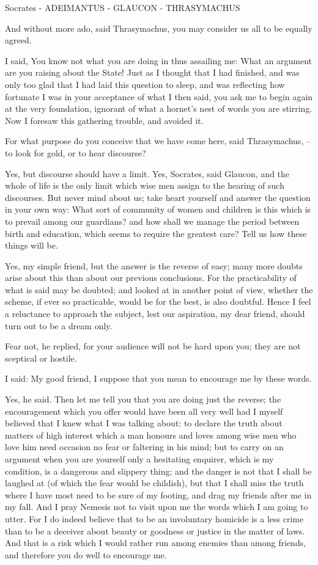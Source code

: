 Socrates - ADEIMANTUS - GLAUCON - THRASYMACHUS

And without more ado, said Thrasymachus, you may consider us all to be equally agreed.

I said, You know not what you are doing in thus assailing me: What an argument are you raising about the State! Just as I thought that I had finished, and was only too glad that I had laid this question to sleep, and was reflecting how fortunate I was in your acceptance of what I then said, you ask me to begin again at the very foundation, ignorant of what a hornet's nest of words you are stirring. Now I foresaw this gathering trouble, and avoided it.

For what purpose do you conceive that we have come here, said Thrasymachus, --to look for gold, or to hear discourse?

Yes, but discourse should have a limit.
Yes, Socrates, said Glaucon, and the whole of life is the only limit which wise men assign to the hearing of such discourses. But never mind about us; take heart yourself and answer the question in your own way: What sort of community of women and children is this which is to prevail among our guardians? and how shall we manage the period between birth and education, which seems to require the greatest care? Tell us how these things will be.

Yes, my simple friend, but the answer is the reverse of easy; many more doubts arise about this than about our previous conclusions. For the practicability of what is said may be doubted; and looked at in another point of view, whether the scheme, if ever so practicable, would be for the best, is also doubtful. Hence I feel a reluctance to approach the subject, lest our aspiration, my dear friend, should turn out to be a dream only.

Fear not, he replied, for your audience will not be hard upon you; they are not sceptical or hostile.

I said: My good friend, I suppose that you mean to encourage me by these words.

Yes, he said.
Then let me tell you that you are doing just the reverse; the encouragement which you offer would have been all very well had I myself believed that I knew what I was talking about: to declare the truth about matters of high interest which a man honours and loves among wise men who love him need occasion no fear or faltering in his mind; but to carry on an argument when you are yourself only a hesitating enquirer, which is my condition, is a dangerous and slippery thing; and the danger is not that I shall be laughed at (of which the fear would be childish), but that I shall miss the truth where I have most need to be sure of my footing, and drag my friends after me in my fall. And I pray Nemesis not to visit upon me the words which I am going to utter. For I do indeed believe that to be an involuntary homicide is a less crime than to be a deceiver about beauty or goodness or justice in the matter of laws. And that is a risk which I would rather run among enemies than among friends, and therefore you do well to encourage me.

